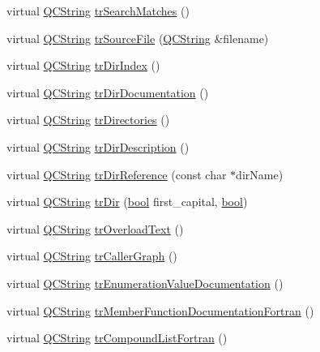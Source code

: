 \begin{DoxyCompactItemize}
virtual \hyperlink{class_q_c_string}{Q\+C\+String} \hyperlink{class_translator_vietnamese_a38708ebc35882b46325bbee55065d2b6}{tr\+Search\+Matches} ()
\item 
virtual \hyperlink{class_q_c_string}{Q\+C\+String} \hyperlink{class_translator_vietnamese_a27928cfb9aa5bad7aa306cc0a2296d56}{tr\+Source\+File} (\hyperlink{class_q_c_string}{Q\+C\+String} \&filename)
\item 
virtual \hyperlink{class_q_c_string}{Q\+C\+String} \hyperlink{class_translator_vietnamese_aabe2a62caa6ae4bd026ea8ebf7b1408a}{tr\+Dir\+Index} ()
\item 
virtual \hyperlink{class_q_c_string}{Q\+C\+String} \hyperlink{class_translator_vietnamese_a482af304c4079f98fb1db63abc395737}{tr\+Dir\+Documentation} ()
\item 
virtual \hyperlink{class_q_c_string}{Q\+C\+String} \hyperlink{class_translator_vietnamese_a3f3915e52140601ac949071a43a0850f}{tr\+Directories} ()
\item 
virtual \hyperlink{class_q_c_string}{Q\+C\+String} \hyperlink{class_translator_vietnamese_a704e01af5383836a98fbe7ef27083114}{tr\+Dir\+Description} ()
\item 
virtual \hyperlink{class_q_c_string}{Q\+C\+String} \hyperlink{class_translator_vietnamese_acaafc303a705375b5fd709deb1985d1f}{tr\+Dir\+Reference} (const char $\ast$dir\+Name)
\item 
virtual \hyperlink{class_q_c_string}{Q\+C\+String} \hyperlink{class_translator_vietnamese_ac229e326629a65442b5acc0462e78464}{tr\+Dir} (\hyperlink{qglobal_8h_a1062901a7428fdd9c7f180f5e01ea056}{bool} first\+\_\+capital, \hyperlink{qglobal_8h_a1062901a7428fdd9c7f180f5e01ea056}{bool})
\item 
virtual \hyperlink{class_q_c_string}{Q\+C\+String} \hyperlink{class_translator_vietnamese_a888bc508ba4d11c3700aedc47836dc53}{tr\+Overload\+Text} ()
\item 
virtual \hyperlink{class_q_c_string}{Q\+C\+String} \hyperlink{class_translator_vietnamese_a4ce284193b5fe011519621c28e60037c}{tr\+Caller\+Graph} ()
\item 
virtual \hyperlink{class_q_c_string}{Q\+C\+String} \hyperlink{class_translator_vietnamese_a7135d41ed09f9679170644718a05229b}{tr\+Enumeration\+Value\+Documentation} ()
\item 
virtual \hyperlink{class_q_c_string}{Q\+C\+String} \hyperlink{class_translator_vietnamese_a24130d70d4b811186de1ec993a8b5215}{tr\+Member\+Function\+Documentation\+Fortran} ()
\item 
virtual \hyperlink{class_q_c_string}{Q\+C\+String} \hyperlink{class_translator_vietnamese_a6df077481654e3d6e831db6dfff0d0cc}{tr\+Compound\+List\+Fortran} ()

\end{DoxyCompactItemize}

